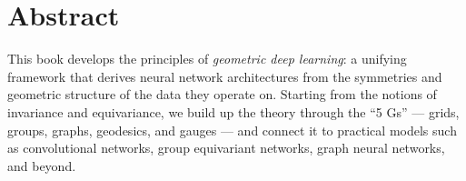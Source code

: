 \chapter*{Abstract}

This book develops the principles of \emph{geometric deep learning}: a
unifying framework that derives neural network architectures from the
symmetries and geometric structure of the data they operate on. Starting
from the notions of invariance and equivariance, we build up the theory
through the ``5 Gs'' — grids, groups, graphs, geodesics, and gauges — and
connect it to practical models such as convolutional networks, group
equivariant networks, graph neural networks, and beyond.
